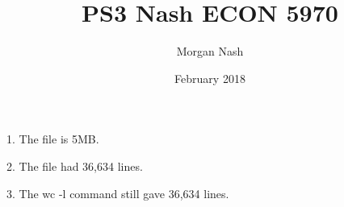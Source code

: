 \documentclass{article}
\title{PS3 Nash ECON 5970}
\author{Morgan Nash}
\date{February 2018}
\begin{document}
\maketitle

1. The file is 5MB.

2. The file had 36,634 lines.

3. The wc -l command still gave 36,634 lines.
\end{document}
